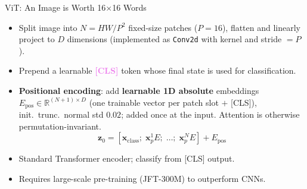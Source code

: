 \begin{frame}{ViT: An Image is Worth 16$\times$16 Words}
\begin{center}
  \end{center}

  \vspace{0.2em}
  \begin{itemize}
    \item Split image into $N = HW/P^2$ fixed-size patches ($P{=}16$), flatten and linearly project to $D$ dimensions (implemented as \texttt{Conv2d} with kernel and stride $=P$).
    \item Prepend a learnable \textcolor{violet}{\textbf{[CLS]}} token whose final state is used for classification.
    \item \textbf{Positional encoding}: add \textbf{learnable 1D absolute} embeddings $E_\text{pos} \in \mathbb{R}^{(N+1) \times D}$ (one trainable vector per patch slot $+$ [CLS]), init.\ trunc.\ normal std $0.02$; added once at the input. Attention is otherwise permutation-invariant.
    \[
      \mathbf{z}_0 = [\mathbf{x}_\text{class};\; \mathbf{x}_p^1 E;\; \ldots;\; \mathbf{x}_p^N E] + E_\text{pos}
    \]
    \item Standard Transformer encoder; classify from [CLS] output.
    \item Requires large-scale pre-training (JFT-300M) to outperform CNNs.
  \end{itemize}
\end{frame}


